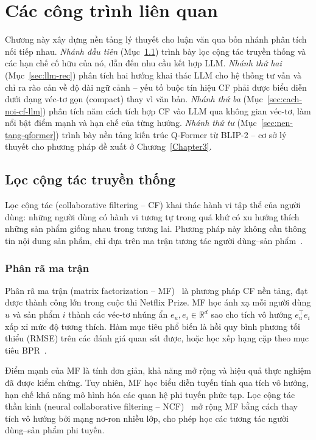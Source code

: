 \chapter{Các công trình liên quan}
\label{Chapter2}

Chương này xây dựng nền tảng lý thuyết cho luận văn qua bốn nhánh phân tích nối tiếp
nhau. \textit{Nhánh đầu tiên} (Mục~\ref{sec:cf-truyen-thong}) trình bày lọc cộng tác
truyền thống và các hạn chế cố hữu của nó, dẫn đến nhu cầu kết hợp LLM. \textit{Nhánh
thứ hai} (Mục~\ref{sec:llm-rec}) phân tích hai hướng khai thác LLM cho hệ thống tư vấn
và chỉ ra rào cản về độ dài ngữ cảnh -- yếu tố buộc tín hiệu CF phải được biểu diễn
dưới dạng véc-tơ gọn (compact) thay vì văn bản. \textit{Nhánh thứ ba}
(Mục~\ref{sec:cach-noi-cf-llm}) phân tích năm cách tích hợp CF vào LLM qua không gian
véc-tơ, làm nổi bật điểm mạnh và hạn chế của từng hướng. \textit{Nhánh thứ tư}
(Mục~\ref{sec:nen-tang-qformer}) trình bày nền tảng kiến trúc Q-Former từ BLIP-2 -- cơ sở
lý thuyết cho phương pháp đề xuất ở Chương~\ref{Chapter3}.

\section{Lọc cộng tác truyền thống}
\label{sec:cf-truyen-thong}

Lọc cộng tác (collaborative filtering -- CF) khai thác hành vi tập thể của người dùng:
những người dùng có hành vi tương tự trong quá khứ có xu hướng thích những sản phẩm
giống nhau trong tương lai. Phương pháp này không cần thông tin nội dung sản phẩm, chỉ
dựa trên ma trận tương tác người dùng--sản phẩm~\cite{zhang2019deep}.

\subsection{Phân rã ma trận}
\label{ssec:mf}

Phân rã ma trận (matrix factorization -- MF)~\cite{mf2009} là phương pháp CF nền tảng,
đạt được thành công lớn trong cuộc thi Netflix Prize. MF học ánh xạ mỗi người dùng $u$
và sản phẩm $i$ thành các véc-tơ nhúng ẩn $e_u, e_i \in \mathbb{R}^d$ sao cho tích vô
hướng $e_u^\top e_i$ xấp xỉ mức độ tương thích. Hàm mục tiêu phổ biến là hồi quy bình
phương tối thiểu (RMSE) trên các đánh giá quan sát được, hoặc học xếp hạng cặp theo mục
tiêu BPR~\cite{bpr2009}.

Điểm mạnh của MF là tính đơn giản, khả năng mở rộng và hiệu quả thực nghiệm đã được
kiểm chứng. Tuy nhiên, MF học biểu diễn tuyến tính qua tích vô hướng, hạn chế khả năng
mô hình hóa các quan hệ phi tuyến phức tạp. Lọc cộng tác thần kinh (neural collaborative
filtering -- NCF)~\cite{ncf2017} mở rộng MF bằng cách thay tích vô hướng bởi mạng nơ-ron
nhiều lớp, cho phép học các tương tác người dùng--sản phẩm phi tuyến.

